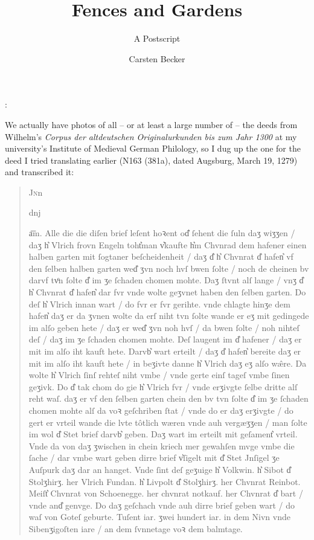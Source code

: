 \documentclass[12pt,paper=a4]{scrartcl}
\author{Carsten Becker}
\title{Fences and Gardens}
\subtitle{A Postscript}
\newcommand{\tit}[1]{\textit{#1}} %
\newlength{\charwidth}
\newcommand{\innomdom}[3]{
	\setlength{\charwidth}{\widthof{#2'}}#1#2\mbox{\makebox[-\charwidth]{\raisebox{1.6\depth}{\rotatebox{180}{\fontspec{FreeSerif}ⷹ}}}\hspace{\charwidth}#3}
}
\newenvironment{mytitle}{
  \hfill
  \begin{minipage}{0.667\textwidth}
	\vspace{\baselineskip}
	\begin{center}
	  \Large
	  \sffamily\bfseries
	  \makeatletter
}{
	  \makeatother
	\end{center}
	\vspace{1em}
  \end{minipage}
  \hfill
}
\begin{document}

\begin{mytitle}
  \@title: \@subtitle
\end{mytitle}

We actually have photos of all -- or at least a large number of -- the deeds from 
Wilhelm's \tit{Corpus der altdeutschen Originalurkunden bis zum Jahr 1300} at my 
university's Institute of Medieval German Philology, so I dug up the one for 
the deed I tried translating earlier (N163 (381a), dated Augsburg, March 19, 
1279) and transcribed it:

\begin{quotation}
\innomdom{\lettrine[lines=3,lraise=0.25]{J}{\upshape n}}{n}{}\innomdom{d}{n}{j} 
a͞m. Alle die die diſen brief leſent hoꝛent od͛ ſehent die ſuln daʒ wiʒʒen / daʒ h͛ 
Vlrich frovn Engeln toht͛man v͛kaufte h͛m Chvnrad dem hafener einen halben garten 
mit ſogtaner beſcheidenheit / daʒ d͛ h͛ Chvnrat d͛ hafen͛ vf den ſelben halben garten wed͛ ʒvn noch hvſ bwen ſolte / noch 
de cheinen bv darvf tvͦn ſolte d͛ im ʒe ſchaden chomen mohte. Daʒ ſtvnt alſ lange 
/ vnʒ d͛ h͛ Chvnrat d͛ hafen͛ dar fvr vnde wolte geʒvnet haben den ſelben garten. 
Do deſ h͛ Vlrich innan wart / do fvr er fvr gerihte. vnde chlagte hinʒe dem hafen͛ 
daʒ er da ʒvnen wolte da erſ niht tvn ſolte wande er eʒ mit gedingede im alſo 
geben hete / daʒ er wed͛ ʒvn noh hvſ / da bwen ſolte / noh nihteſ deſ / daʒ im ʒe 
ſchaden chomen mohte. Deſ laugent im d͛ hafener / daʒ er mit im alſo iht kauft 
hete. Darvb͛ wart erteilt / daʒ d͛ hafen͛ bereite daʒ er mit im alſo iht kauft hete 
/ in beʒivte danne h͛ Vlrich daʒ eʒ alſo wæ̂re. Da wolte h͛ Vlrich ſinſ rehteſ niht 
vmbe / vnde gerte einſ tageſ vmbe ſinen geʒivk. Do d͛ tak chom do gie h͛ Vlrich 
fvr / vnde erʒivgte ſelbe dritte alſ reht waſ. daʒ er vf den ſelben garten chein 
den bv tvn ſolte d͛ im ʒe ſchaden chomen mohte alſ da voꝛ geſchriben ſtat / vnde 
do er daʒ erʒivgte / do gert er vrteil wande die lvte tôtlich wæren vnde auh 
vergæʒʒen / man ſolte im wol d͛ Stet brief darvb͛ geben. Daʒ wart im erteilt mit 
geſament͛ vrteil. Vnde da von daʒ ʒwischen in chein kriech mer gewahſen mvge vmbe 
die ſache / dar vmbe wart geben dirre brief v͛ſigelt mit d͛ Stet Jnſigel ʒe Auſpurk 
daʒ dar an hanget. Vnde ſint deſ geʒuige h͛ Volkwin. h͛ Sibot d͛ Stolʒhirʒ. her 
Vlrich Fundan. h͛ Livpolt d͛ Stolʒhirʒ. her Chvnrat Reinbot. Meiſt͛ Chvnrat von 
Schoenegge. her chvnrat notkauf. her Chvnrat d͛ bart / vnde and͛ genvge. Do daʒ 
geſchach vnde auh dirre brief geben wart / do waſ von Goteſ geburte. Tuſent iar. 
ʒwei hundert iar. in dem Nivn vnde Sibenʒigoſten iare / an dem ſvnnetage voꝛ dem 
balmtage.
\end{quotation}
\end{document}
